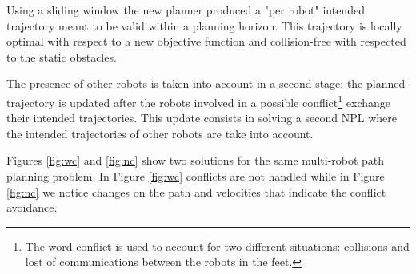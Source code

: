 Using a sliding window the new planner produced a "per robot" intended trajectory meant to be valid within a planning horizon. This trajectory is locally optimal with respect to a new objective function and collision-free with respected to the static obstacles.

The presence of other robots is taken into account in a second stage: the planned trajectory is updated after the robots involved in a possible conflict\footnote{The word conflict is used to account for two different situations: collisions and lost of communications between the robots in the feet.} exchange their intended trajectories. This update consists in solving a second NPL where the intended trajectories of other robots are take into account.

Figures \ref{fig:wc} and \ref{fig:nc} show two solutions for the same multi-robot path planning problem. In Figure \ref{fig:wc} conflicts are not handled while in Figure \ref{fig:nc} we notice changes on the path and velocities that indicate the conflict avoidance.


